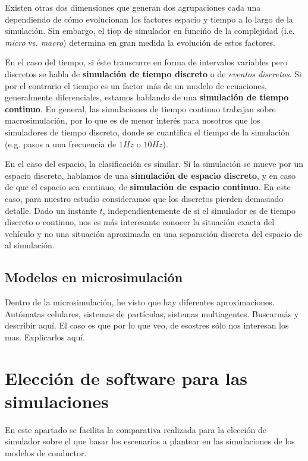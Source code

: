 Existen otras dos dimensiones que generan dos agrupaciones cada una dependiendo de cómo evolucionan los factores espacio y tiempo a lo largo de la simulación. Sin embargo, el tiop de simulador en funcińo de la complejidad (i.e. \textit{micro} vs. \textit{macro}) determina en gran medida la evolución de estos factores.

En el caso del tiempo, si éste transcurre en forma de intervalos variables pero discretos se habla de \textbf{simulación de tiempo discreto} o de \textit{eventos discretos}. Si por el contrario el tiempo es un factor más de un modelo de ecuaciones, generalmente diferenciales, estamos hablando de una \textbf{simulación de tiempo continuo}. En general, las simulaciones de tiempo continuo trabajan sobre macrosimulación, por lo que es de menor interés para nosotros que los simuladores de tiempo discreto, donde se cuantifica el tiempo de la simulación (e.g. pasos a una frecuencia de $1Hz$ o $10Hz$).

En el caso del espacio, la clasificación es similar. Si la simulación se mueve por un espacio discreto, hablamos de una \textbf{simulación de espacio discreto}, y en caso de que el espacio sea continuo, de \textbf{simulación de espacio continuo}. En este caso, para nuestro estudio consideramos que los discretos pierden demasiado detalle. Dado un instante $t$, independientemente de si el simulador es de tiempo discreto o continuo, nos es más interesante conocer la situación exacta del vehículo y no una situación aproximada en una separación discreta del espacio de al simulación.

\subsection{Modelos en microsimulación}

Dentro de la microsimulación, he visto que hay diferentes aproximaciones. Autómatas celulares, sistemas de partículas, sistemas multiagentes. Buscarmás y describir aquí. El caso es que por lo que veo, de esostres sólo nos interesan los mas. Explicarlos aquí.


\section{Elección de software para las simulaciones}

En este apartado se facilita la comparativa realizada para la elección de simulador sobre el que basar los escenarios a plantear en las simulaciones de los modelos de conductor.

